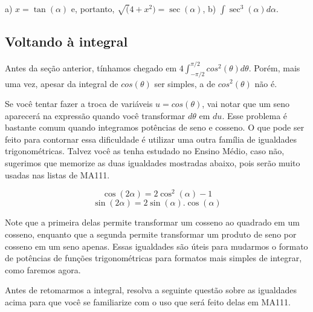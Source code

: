 \documentclass[main_estudante.tex]{subfiles}
\begin{document}
\begin{gabarito}
	\begin{gabaritoQuestao}
		a) $x=\tan(\alpha)$ e, portanto, $\sqrt(4+x^2)=\sec(\alpha)$, b) $\int \sec^3(\alpha)d\alpha$.
	\end{gabaritoQuestao}
\end{gabarito}

\subsection*{Voltando à integral}

Antes da seção anterior, tínhamos chegado em $4\int_{-\pi/2}^{\pi/2} cos^2(\theta)d\theta$. Porém, mais uma vez, apesar da integral de $cos(\theta)$ ser simples, a de $cos^2(\theta)$ não é.

Se você tentar fazer a troca de variáveis $u=cos(\theta)$, vai notar que um seno aparecerá na expressão quando você transformar $d\theta$ em $du$. Esse problema é bastante comum quando integramos potências de seno e cosseno. O que pode ser feito para contornar essa dificuldade é utilizar uma outra família de igualdades trigonométricas. Talvez você as tenha estudado no Ensino Médio, caso não, sugerimos que memorize as duas igualdades mostradas abaixo, pois serão muito usadas nas listas de MA111.

\begin{shaded*}
$$\cos(2\alpha) = 2\cos^2(\alpha)-1$$
$$\sin(2\alpha) = 2\sin(\alpha).\cos(\alpha)$$
\end{shaded*}

Note que a primeira delas permite transformar um cosseno ao quadrado em um cosseno, enquanto que a segunda permite transformar um produto de seno por cosseno em um seno apenas. Essas igualdades são úteis para mudarmos o formato de potências de funções trigonométricas para formatos mais simples de integrar, como faremos agora.

Antes de retomarmos a integral, resolva a seguinte questão sobre as igualdades acima para que você se familiarize com o uso que será feito delas em MA111.

\end{document}
